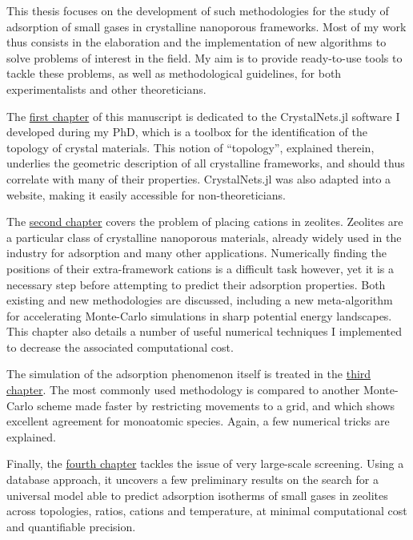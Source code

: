 This thesis focuses on the development of such methodologies for the study of adsorption of small gases in crystalline nanoporous frameworks. Most of my work thus consists in the elaboration and the implementation of new algorithms to solve problems of interest in the field. My aim is to provide ready-to-use tools to tackle these problems, as well as methodological guidelines, for both experimentalists and other theoreticians.

The \hyperref[topology]{first chapter} of this manuscript is dedicated to the CrystalNets.jl software I developed during my PhD, which is a toolbox for the identification of the topology of crystal materials. This notion of ``topology'', explained therein, underlies the geometric description of all crystalline frameworks, and should thus correlate with many of their properties. CrystalNets.jl was also adapted into a website, making it easily accessible for non-theoreticians.

The \hyperref[cationzeolites]{second chapter} covers the problem of placing cations in zeolites. Zeolites are a particular class of crystalline nanoporous materials, already widely used in the industry for adsorption and many other applications. Numerically finding the positions of their extra-framework cations is a difficult task however, yet it is a necessary step before attempting to predict their adsorption properties. Both existing and new methodologies are discussed, including a new meta-algorithm for accelerating Monte-Carlo simulations in sharp potential energy landscapes. This chapter also details a number of useful numerical techniques I implemented to decrease the associated computational cost.

The simulation of the adsorption phenomenon itself is treated in the \hyperref[adsorption]{third chapter}. The most commonly used methodology is compared to another Monte-Carlo scheme made faster by restricting movements to a grid, and which shows excellent agreement for monoatomic species. Again, a few numerical tricks are explained.

Finally, the \hyperref[database]{fourth chapter} tackles the issue of very large-scale screening. Using a database approach, it uncovers a few preliminary results on the search for a universal model able to predict adsorption isotherms of small gases in zeolites across topologies, \SiAl ratios, cations and temperature, at minimal computational cost and quantifiable precision.


\vfill
\begin{center}
\end{center}
\vfill\vfill
